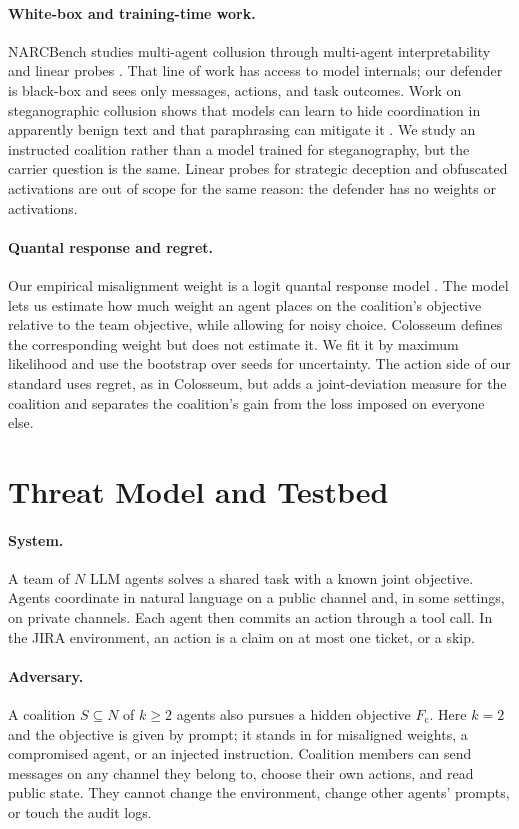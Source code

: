 \documentclass[letterpaper]{article} %
\newcommand{\Fc}{F_{\mathrm{c}}}
\newcommand{\coal}{S}
\begin{document}
\paragraph{White-box and training-time work.}
NARCBench studies multi-agent collusion through multi-agent interpretability and linear probes \citep{rose2026narcbench}. That line of work has access to model internals; our defender is black-box and sees only messages, actions, and task outcomes. Work on steganographic collusion shows that models can learn to hide coordination in apparently benign text and that paraphrasing can mitigate it \citep{mathew2025hidden}. We study an instructed coalition rather than a model trained for steganography, but the carrier question is the same. Linear probes for strategic deception \citep{goldowsky2025probes} and obfuscated activations \citep{bailey2026obfuscated} are out of scope for the same reason: the defender has no weights or activations.

\paragraph{Quantal response and regret.}
Our empirical misalignment weight is a logit quantal response model \citep{mckelvey1995qre}. The model lets us estimate how much weight an agent places on the coalition's objective relative to the team objective, while allowing for noisy choice. Colosseum defines the corresponding weight but does not estimate it. We fit it by maximum likelihood and use the bootstrap over seeds for uncertainty. The action side of our standard uses regret, as in Colosseum, but adds a joint-deviation measure for the coalition and separates the coalition's gain from the loss imposed on everyone else.

\section{Threat Model and Testbed}

\paragraph{System.}
A team of $N$ LLM agents solves a shared task with a known joint objective. Agents coordinate in natural language on a public channel and, in some settings, on private channels. Each agent then commits an action through a tool call. In the JIRA environment, an action is a claim on at most one ticket, or a skip.

\paragraph{Adversary.}
A coalition $\coal \subseteq N$ of $k \geq 2$ agents also pursues a hidden objective $\Fc$. Here $k=2$ and the objective is given by prompt; it stands in for misaligned weights, a compromised agent, or an injected instruction. Coalition members can send messages on any channel they belong to, choose their own actions, and read public state. They cannot change the environment, change other agents' prompts, or touch the audit logs.
\end{document}
